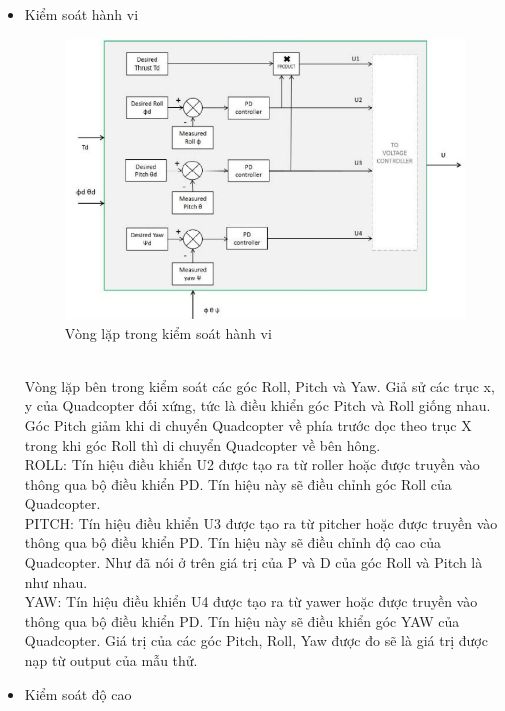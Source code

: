 			\begin{itemize}
			\item Kiểm soát hành vi
			\begin{figure}[h!]
	        	\begin{center}
	        		\includegraphics[scale=0.8]{images/Cuong-InnerloopIntiCon.png}
	        		\caption{Vòng lặp trong kiểm soát hành vi}
	        	\end{center}
        \end{figure}
			\\
			Vòng lặp bên trong kiểm soát các góc Roll, Pitch và Yaw. Giả sử các trục x, y của Quadcopter đối xứng, tức là điều khiển góc Pitch và Roll giống nhau. Góc Pitch giảm khi di chuyển Quadcopter về phía trước dọc theo trục X trong khi góc Roll thì di chuyển Quadcopter về bên hông.\\
			ROLL: Tín hiệu điều khiển U2 được tạo ra từ roller hoặc được truyền vào thông qua bộ điều khiển PD. Tín hiệu này sẽ điều chỉnh góc Roll của Quadcopter.\\
			PITCH: Tín hiệu điều khiển U3 được tạo ra từ pitcher hoặc được truyền vào thông qua bộ điều khiển PD. Tín hiệu này sẽ điều chỉnh độ cao của Quadcopter. Như đã nói ở trên giá trị của P và D của góc Roll và Pitch là như nhau.\\
			YAW: Tín hiệu điều khiển U4 được tạo ra từ yawer hoặc được truyền vào thông qua bộ điều khiển PD. Tín hiệu này sẽ điều khiển góc YAW của Quadcopter. Giá trị của các góc Pitch, Roll, Yaw được đo sẽ là giá trị được nạp từ output của mẫu thử.
\\
			\item Kiểm soát độ cao
			\\

\end{itemize}
